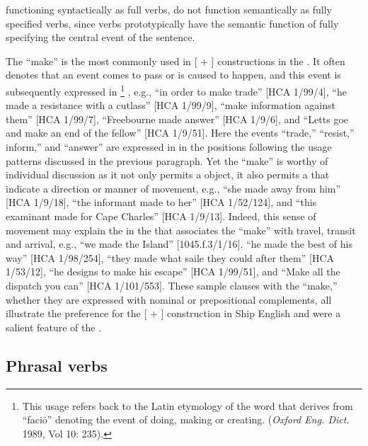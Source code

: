 functioning syntactically as full verbs, do not function semantically as fully specified verbs, since verbs prototypically have the semantic function of fully specifying the central event of the sentence. 

The  “make” is the most commonly used  in [ + ] constructions in the . It often denotes that an event comes to pass or is caused to happen, and this event is subsequently expressed in \footnote{This usage refers back to the Latin etymology of the word that derives from “{faciō}” denoting the event of doing, making or creating. (\textit{Oxford Eng. Dict.} 1989, Vol 10: 235).} , e.g., “in order to make trade” [HCA 1/99/4], “he made a resistance with a cutlass” [HCA 1/99/9], “make information against them” [HCA 1/99/7], “Freebourne made answer” [HCA 1/9/6], and “Letts goe and make an end of the fellow” [HCA 1/9/51]. Here the events “trade,” “resist,” inform,” and “answer” are expressed in  in the  positions following the usage patterns discussed in the previous paragraph. Yet the  “make” is worthy of individual discussion as it not only permits a  object, it also permits a  that indicate a direction or manner of movement, e.g., “she made away from him” [HCA 1/9/18], “the informant made to her” [HCA 1/52/124], and “this examinant made for Cape Charles” [HCA 1/9/13]. Indeed, this sense of movement may explain the  in the  that associates the  “make” with travel, transit and arrival, e.g., “we made the Island” [1045.f.3/1/16], “he made the best of his way” [HCA 1/98/254], “they made what saile they could after them” [HCA 1/53/12], “he designs to make his escape” [HCA 1/99/51], and “Make all the dispatch you can” [HCA 1/101/553]. These sample clauses with the  “make,” whether they are expressed with nominal or prepositional complements, all illustrate the preference for the [ + ] construction in Ship English and were a salient feature of the . 

\subsection{{Phrasal verbs}}\label{sec:6.1.2}

